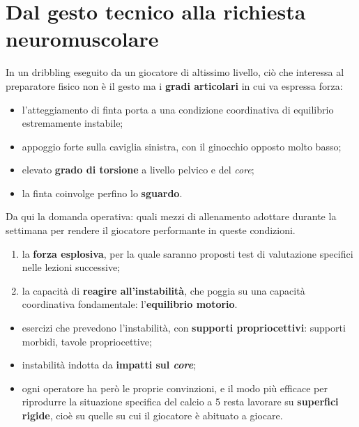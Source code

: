 \section{Dal gesto tecnico alla richiesta neuromuscolare}

In un dribbling eseguito da un giocatore di altissimo livello, ciò che interessa al preparatore
fisico non è il gesto ma i \textbf{gradi articolari} in cui va espressa forza:
\begin{itemize}
  \item l'atteggiamento di finta porta a una condizione coordinativa di equilibrio estremamente
    instabile;
  \item appoggio forte sulla caviglia sinistra, con il ginocchio opposto molto basso;
  \item elevato \textbf{grado di torsione} a livello pelvico e del \textit{core};
  \item la finta coinvolge perfino lo \textbf{sguardo}.
\end{itemize}
Da qui la domanda operativa: quali mezzi di allenamento adottare durante la settimana per rendere il
giocatore performante in queste condizioni.

\begin{enumerate}
  \item la \textbf{forza esplosiva}, per la quale saranno proposti test di valutazione specifici
    nelle lezioni successive;
  \item la capacità di \textbf{reagire all'instabilità}, che poggia su una capacità coordinativa
    fondamentale: l'\textbf{equilibrio motorio}.
\end{enumerate}

\begin{itemize}
  \item esercizi che prevedono l'instabilità, con \textbf{supporti propriocettivi}: supporti
    morbidi, tavole propriocettive;
  \item instabilità indotta da \textbf{impatti sul \textit{core}};
  \item ogni operatore ha però le proprie convinzioni, e il modo più efficace per riprodurre la
    situazione specifica del calcio a 5 resta lavorare su \textbf{superfici rigide}, cioè su quelle
    su cui il giocatore è abituato a giocare.
\end{itemize}

